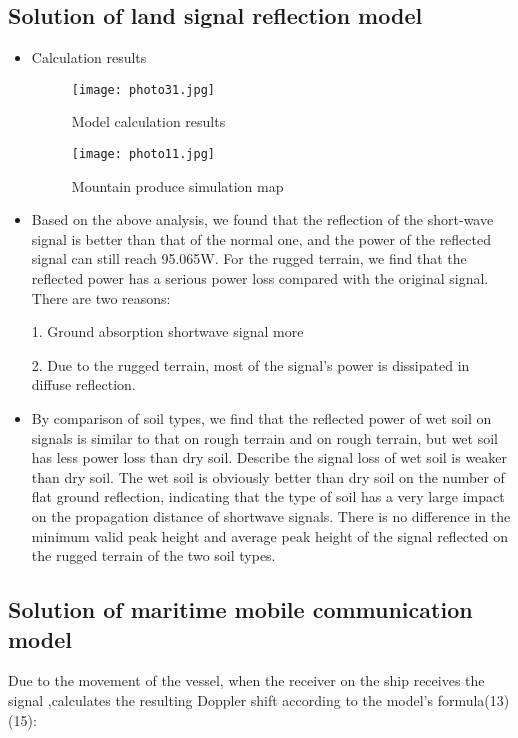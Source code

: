 \documentclass{mcmthesis}
\begin{document}
\subsection{Solution of land signal reflection model}%
\begin{itemize}
\item Calculation results
\begin{figure}[h]
\small
\centering
\texttt{[image: photo31.jpg]}
\caption{Model calculation results} \label{fig:aa}
\end{figure}
\begin{figure}[h]
\small
\centering
\texttt{[image: photo11.jpg]}
\caption{Mountain produce simulation map} \label{fig:aa}
\end{figure}
\item Based on the above analysis, we found that the reflection of the short-wave signal is better than that of the normal one, and the power of the reflected signal can still reach 95.065W. For the rugged terrain, we find that the reflected power has a serious power loss compared with the original signal. There are two reasons:

1. Ground absorption shortwave signal more

2. Due to the rugged terrain, most of the signal's power is dissipated in diffuse reflection.
\item By comparison of soil types, we find that the reflected power of wet soil on signals is similar to that on rough terrain and on rough terrain, but wet soil has less power loss than dry soil. Describe the signal loss of wet soil is weaker than dry soil. The wet soil is obviously better than dry soil on the number of flat ground reflection, indicating that the type of soil has a very large impact on the propagation distance of shortwave signals. There is no difference in the minimum valid peak height and average peak height of the signal reflected on the rugged terrain of the two soil types.
\end{itemize}
\subsection{Solution of maritime mobile communication model}
Due to the movement of the vessel, when the receiver on the ship receives the signal ,calculates the resulting Doppler shift according to the model's formula(13)(15):
\end{document}
